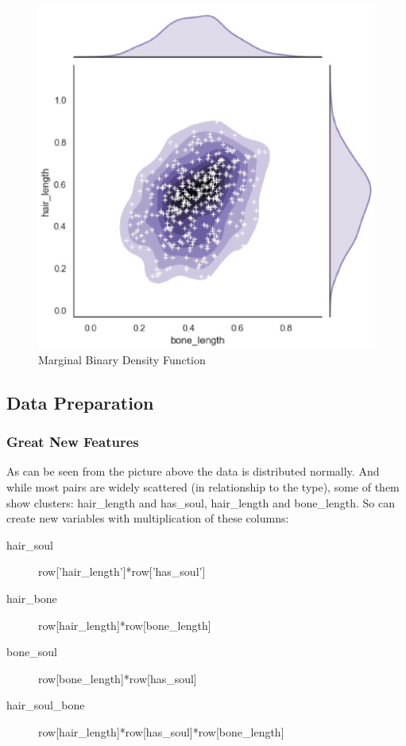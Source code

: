 \begin{figure}[h]\centering
	\includegraphics[scale=0.3]{figures/MBDF.eps}
	\caption{Marginal Binary Density Function}
\end{figure}

\subsection{Data Preparation}
\subsubsection{Great New Features}
As can be seen from the picture above the data is distributed normally. And while most pairs are widely scattered (in relationship to the type), some of them show clusters: hair_length and has_soul, hair_length and bone_length. So can create new variables with multiplication of these columns: 


\begin{description}
	\item[hair_soul] row[’hair_length’]*row[’has_soul’] 
	\item[hair_bone]  row[hair_length]*row[bone_length] 
	\item[bone_soul]  row[bone_length]*row[has_soul] 
	\item[hair_soul_bone]  row[hair_length]*row[has_soul]*row[bone_length] 
\end{description}

